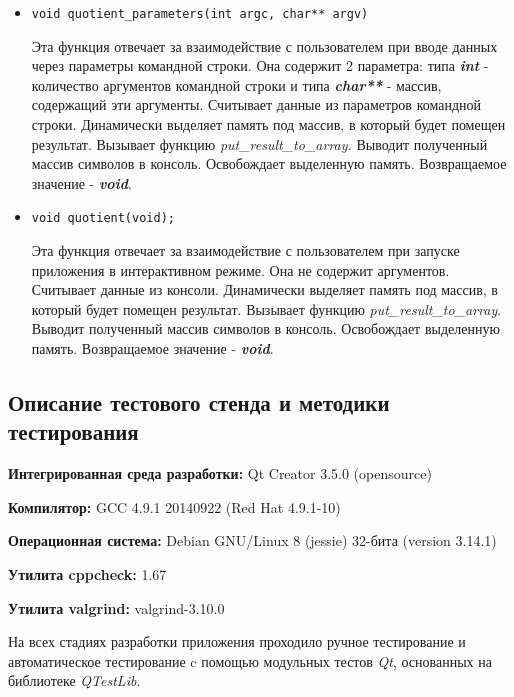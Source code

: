 \documentclass[12pt,a4paper]{report}
\begin{document}
\begin{enumerate}
\begin{itemize}
\item \verb-void quotient_parameters(int argc, char** argv)-

Эта функция отвечает за взаимодействие с пользователем при вводе данных через параметры командной строки. Она содержит 2 параметра: типа \textbf{\textit{int}} - количество аргументов командной строки и типа \textbf{\textit{char**}} - массив, содержащий эти аргументы. Считывает данные из параметров командной строки. Динамически выделяет память под массив, в который будет помещен результат. Вызывает функцию \textit{put\_result\_to\_array.} Выводит полученный массив символов в консоль. Освобождает выделенную память. Возвращаемое значение - \textit{\textbf{void}}.
\end{itemize}

\begin{itemize}
\item \verb-void quotient(void);-

Эта функция отвечает за взаимодействие с пользователем при запуске приложения в интерактивном режиме. Она не содержит аргументов. Считывает данные из консоли. Динамически выделяет память под массив, в который будет помещен результат. Вызывает функцию \textit{put\_result\_to\_array}. Выводит полученный массив символов в консоль. Освобождает выделенную память. Возвращаемое значение - \textit{\textbf{void}}.
\end{itemize}
\end{enumerate}
\subsection{Описание тестового стенда и методики тестирования}

\begin{flushleft}
\textbf{Интегрированная среда разработки:} Qt Creator 3.5.0 (opensource)

\textbf{Компилятор:} GCC 4.9.1 20140922 (Red Hat 4.9.1-10)

\textbf{Операционная система:} Debian GNU/Linux 8 (jessie) 32-бита (version 3.14.1)

\textbf{Утилита cppcheck:} 1.67

\textbf{Утилита valgrind:} valgrind-3.10.0
\end{flushleft}

На всех стадиях разработки приложения проходило ручное тестирование и автоматическое тестирование c помощью модульных тестов \textit{Qt}, основанных на библиотеке  \textit{QTestLib}. 
\end{document}
